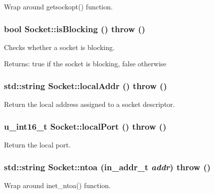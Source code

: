 Wrap around getsockopt() function. 

\hypertarget{classSocket_b09cfdaf17af3afd7c9cd7324aee9789}{
\subsubsection[{isBlocking}]{\setlength{\rightskip}{0pt plus 5cm}bool Socket::isBlocking ()  throw ()}}
\label{classSocket_b09cfdaf17af3afd7c9cd7324aee9789}


Checks whether a socket is blocking. 

\begin{Desc}
\item[Returns:]true if the socket is blocking, false otherwise \end{Desc}
\hypertarget{classSocket_43966682734e24ae021c9ab21b69d9f7}{
\subsubsection[{localAddr}]{\setlength{\rightskip}{0pt plus 5cm}std::string Socket::localAddr ()  throw ()}}
\label{classSocket_43966682734e24ae021c9ab21b69d9f7}


Return the local address assigned to a socket descriptor. 

\hypertarget{classSocket_ca6ab90fa2a1098a143cc59bb4841d80}{
\subsubsection[{localPort}]{\setlength{\rightskip}{0pt plus 5cm}u\_\-int16\_\-t Socket::localPort ()  throw ()}}
\label{classSocket_ca6ab90fa2a1098a143cc59bb4841d80}


Return the local port. 

\hypertarget{classSocket_6e7824108afe85f1004d17b4e3749cc7}{
\subsubsection[{ntoa}]{\setlength{\rightskip}{0pt plus 5cm}std::string Socket::ntoa (in\_\-addr\_\-t {\em addr})  throw ()}}
\label{classSocket_6e7824108afe85f1004d17b4e3749cc7}


Wrap around inet\_\-ntoa() function. 

